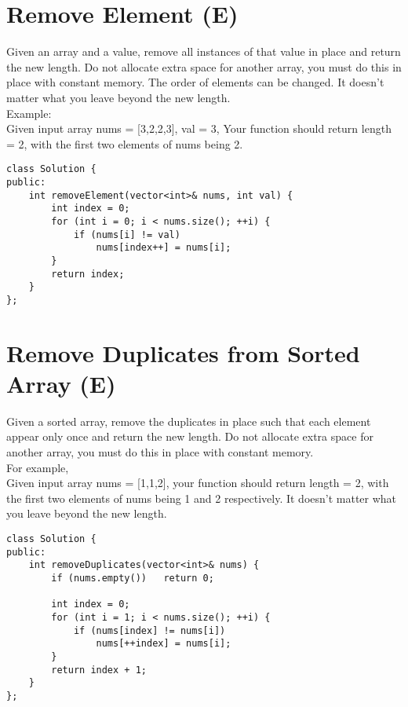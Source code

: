 \section{Remove Element (E)}
Given an array and a value, remove all instances of that value in place and return the new length. Do not allocate extra space for another array, you must do this in place with constant memory. The order of elements can be changed. It doesn't matter what you leave beyond the new length.\\

Example:\\
Given input array nums = [3,2,2,3], val = 3, Your function should return length = 2, with the first two elements of nums being 2.\\
    
\begin{lstlisting}
class Solution {
public:
    int removeElement(vector<int>& nums, int val) {
        int index = 0;
        for (int i = 0; i < nums.size(); ++i) {
            if (nums[i] != val)
                nums[index++] = nums[i];
        }
        return index;
    }
};
\end{lstlisting}


\section{Remove Duplicates from Sorted Array (E)}
Given a sorted array, remove the duplicates in place such that each element appear only once and return the new length. Do not allocate extra space for another array, you must do this in place with constant memory.\\

For example,\\
Given input array nums = [1,1,2], your function should return length = 2, with the first two elements of nums being 1 and 2 respectively. It doesn't matter what you leave beyond the new length. \\
    
\begin{lstlisting}
class Solution {
public:
    int removeDuplicates(vector<int>& nums) {
        if (nums.empty())   return 0;
            
        int index = 0;
        for (int i = 1; i < nums.size(); ++i) {
            if (nums[index] != nums[i])
                nums[++index] = nums[i];
        }
        return index + 1;
    }
};
\end{lstlisting}


